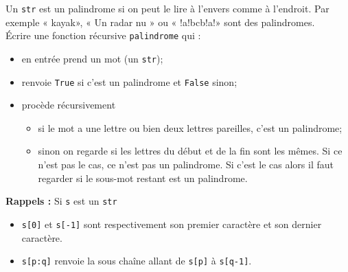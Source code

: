 \documentclass[10pt,firamath,cours]{nsi}
\begin{document}
\begin{exercice}[ : palindromes]
	Un \texttt{str} est un palindrome si on peut le lire à l'envers comme à l'endroit. Par exemple « kayak», «  Un radar nu » ou « !a!bcb!a!» sont des palindromes.\\
	\'Ecrire une fonction récursive \texttt{palindrome} qui :
	\begin{itemize}
		\item 	en entrée prend un mot (un \texttt{str});
		\item 	renvoie \texttt{True} si c'est un palindrome et \texttt{False} sinon;
		\item 	procède récursivement
		      \begin{itemize}
			      \item 	si le mot a une lettre ou bien deux lettres pareilles, c'est un palindrome;
			      \item 	sinon on regarde si les lettres du début et de la fin sont les mêmes. Si ce n'est pas le cas, ce n'est pas un palindrome. Si c'est le cas alors il faut regarder si le sous-mot restant est un palindrome.
		      \end{itemize}
	\end{itemize}
	\textbf{Rappels :}
	Si \texttt{s} est un \texttt{str}
	\begin{itemize}
		\item 	\texttt{s[0]} et \texttt{s[-1]} sont respectivement son premier caractère et son dernier caractère.
		\item 	\texttt{s[p:q]} renvoie la sous chaîne allant de \texttt{s[p]} à \texttt{s[q-1]}.
	\end{itemize}
\end{exercice}
\end{document}
